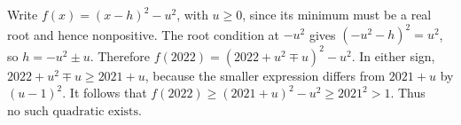 Write $f(x)=(x-h)^2-u^2$, with $u\ge 0$, since its minimum must be a real root and hence nonpositive. The root condition at $-u^2$ gives $(-u^2-h)^2=u^2$, so $h=-u^2\pm u$. Therefore $f(2022)=(2022+u^2\mp u)^2-u^2$. In either sign, $2022+u^2\mp u\ge 2021+u$, because the smaller expression differs from $2021+u$ by $(u-1)^2$. It follows that $f(2022)\ge(2021+u)^2-u^2\ge 2021^2>1$. Thus $\boxed{\text{no such quadratic exists}}$.

